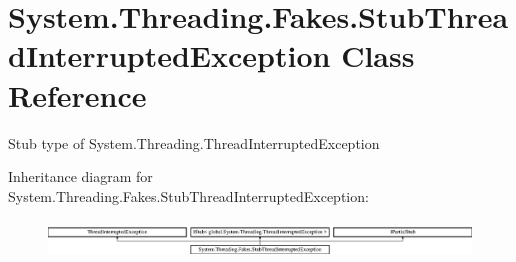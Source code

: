 \hypertarget{class_system_1_1_threading_1_1_fakes_1_1_stub_thread_interrupted_exception}{\section{System.\-Threading.\-Fakes.\-Stub\-Thread\-Interrupted\-Exception Class Reference}
\label{class_system_1_1_threading_1_1_fakes_1_1_stub_thread_interrupted_exception}
}


Stub type of System.\-Threading.\-Thread\-Interrupted\-Exception 


Inheritance diagram for System.\-Threading.\-Fakes.\-Stub\-Thread\-Interrupted\-Exception\-:\begin{figure}[H]
\begin{center}
\leavevmode
\includegraphics[height=1.006289cm]{class_system_1_1_threading_1_1_fakes_1_1_stub_thread_interrupted_exception}
\end{center}
\end{figure}
